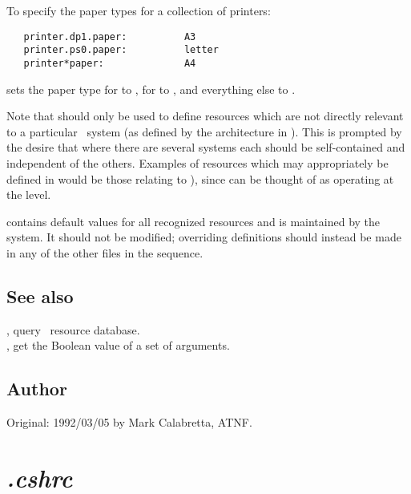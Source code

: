 To specify the paper types for a collection of printers:

\begin{verbatim}
   printer.dp1.paper:          A3
   printer.ps0.paper:          letter
   printer*paper:              A4
\end{verbatim}

\noindent
sets the paper type for  to , for  to
, and everything else to .

Note that  should only be used to define resources
which are not directly relevant to a particular \aipspp\ system (as defined by
the architecture in ).  This is prompted by the desire that
where there are several systems each should be self-contained and independent
of the others.  Examples of resources which may appropriately be defined in
 would be those relating to ), since
 can be thought of as operating at the 
level.

 contains default values for all recognized resources
and is maintained by the system.  It should not be modified; overriding
definitions should instead be made in any of the other  files in
the sequence.

\subsection*{See also}

, query \aipspp\ resource database.\\
, get the Boolean value of a set of arguments.\\

\subsection*{Author}

Original: 1992/03/05 by Mark Calabretta, ATNF.


\newpage
\section{\textit{.cshrc}}
\label{.cshrc}

